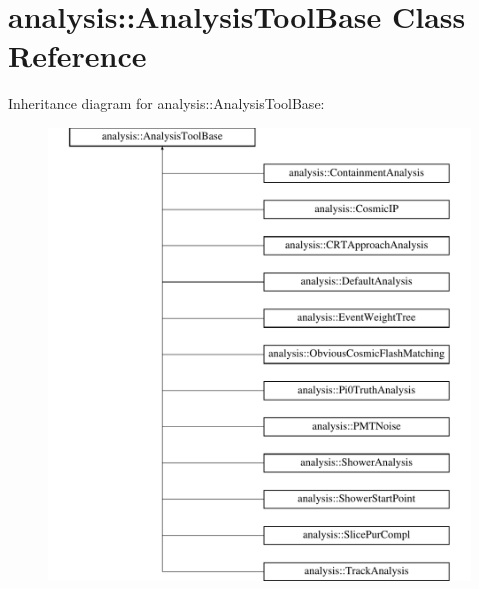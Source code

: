 \hypertarget{classanalysis_1_1AnalysisToolBase}{\section{analysis\-:\-:Analysis\-Tool\-Base Class Reference}
\label{classanalysis_1_1AnalysisToolBase}
}
Inheritance diagram for analysis\-:\-:Analysis\-Tool\-Base\-:\begin{figure}[H]
\begin{center}
\leavevmode
\includegraphics[height=12.000000cm]{classanalysis_1_1AnalysisToolBase}
\end{center}
\end{figure}
